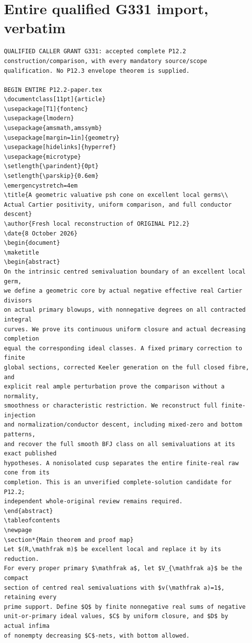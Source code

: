 \documentclass[
  11pt,
]{article}
\begin{document}
\appendix
\clearpage
\section{Entire qualified G331 import, verbatim}
\begin{lstlisting}
QUALIFIED CALLER GRANT G331: accepted complete P12.2 construction/comparison, with every mandatory source/scope qualification. No P12.3 envelope theorem is supplied.

BEGIN ENTIRE P12.2-paper.tex
\documentclass[11pt]{article}
\usepackage[T1]{fontenc}
\usepackage{lmodern}
\usepackage{amsmath,amssymb}
\usepackage[margin=1in]{geometry}
\usepackage[hidelinks]{hyperref}
\usepackage{microtype}
\setlength{\parindent}{0pt}
\setlength{\parskip}{0.6em}
\emergencystretch=4em
\title{A geometric valuative psh cone on excellent local germs\\
Actual Cartier positivity, uniform comparison, and full conductor descent}
\author{Fresh local reconstruction of ORIGINAL P12.2}
\date{8 October 2026}
\begin{document}
\maketitle
\begin{abstract}
On the intrinsic centred semivaluation boundary of an excellent local germ,
we define a geometric core by actual negative effective real Cartier divisors
on actual primary blowups, with nonnegative degrees on all contracted integral
curves. We prove its continuous uniform closure and actual decreasing completion
equal the corresponding ideal classes. A fixed primary correction to finite
global sections, corrected Keeler generation on the full closed fibre, and
explicit real ample perturbation prove the comparison without a normality,
smoothness or characteristic restriction. We reconstruct full finite-injection
and normalization/conductor descent, including mixed-zero and bottom patterns,
and recover the full smooth BFJ class on all semivaluations at its exact published
hypotheses. A nonisolated cusp separates the entire finite-real raw cone from its
completion. This is an unverified complete-solution candidate for P12.2;
independent whole-original review remains required.
\end{abstract}
\tableofcontents
\newpage
\section*{Main theorem and proof map}
Let $(R,\mathfrak m)$ be excellent local and replace it by its reduction.
For every proper primary $\mathfrak a$, let $V_{\mathfrak a}$ be the compact
section of centred real semivaluations with $v(\mathfrak a)=1$, retaining every
prime support. Define $Q$ by finite nonnegative real sums of negative
unit-or-primary ideal values, $C$ by uniform closure, and $D$ by actual infima
of nonempty decreasing $C$-nets, with bottom allowed.


\end{lstlisting}
\end{document}
